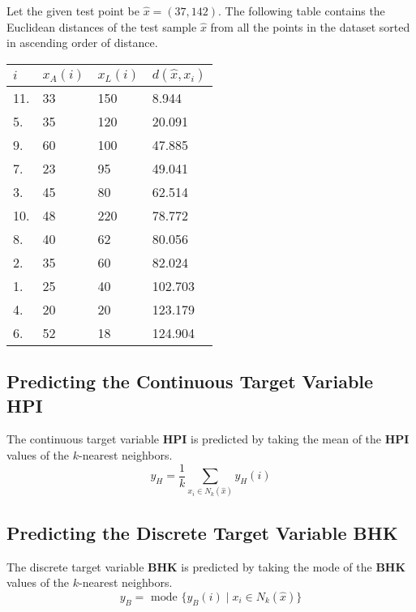 \documentclass[12pt]{article}
\begin{document}
    Let the given test point be $\hat{x} = (37, 142)$.
    The following table contains the Euclidean distances of the test sample $\hat{x}$ from all the points in the dataset
    sorted in ascending order of distance.
    \vspace*{10pt}
    \renewcommand{\arraystretch}{1.5}
    \begin{center}
        \begin{tabular}{| m{10mm} | m{15mm} | m{15mm} | m{80mm} |}
            \hline
            \large{$i$} & \large{$x_{A}(i)$} & \large{$x_{L}(i)$} & \large{$d(\hat{x}, x_{i})$} \\
            \hline
            \hline 11. & 33 & 150 & 8.944 \\
            \hline 5. & 35 & 120 & 20.091 \\
            \hline 9. & 60 & 100 & 47.885 \\
            \hline 7. & 23 & 95 & 49.041 \\
            \hline 3. & 45 & 80 & 62.514 \\
            \hline 10. & 48 & 220 & 78.772 \\
            \hline 8. & 40 & 62 & 80.056 \\
            \hline 2. & 35 & 60 & 82.024 \\
            \hline 1. & 25 & 40 & 102.703 \\
            \hline 4. & 20 & 20 & 123.179 \\
            \hline 6. & 52 & 18 & 124.904 \\
            \hline
        \end{tabular}
    \end{center}

    \subsection*{Predicting the Continuous Target Variable \textbf{HPI}}
    The continuous target variable \textbf{HPI} is predicted by taking the mean of the \textbf{HPI} values of the $k$-nearest neighbors.
    \begin{equation}
        \label{eq:HPI}
        y_{H} = \frac{1}{k} \sum_{x_{i} \in N_{k}(\hat{x})} y_{H}(i)
    \end{equation}

    \subsection*{Predicting the Discrete Target Variable \textbf{BHK}}
    The discrete target variable \textbf{BHK} is predicted by taking the mode of the \textbf{BHK} values of the $k$-nearest neighbors.
    \begin{equation}
        \label{eq:BHK}
        y_{B} = \text{ mode } \{ y_{B}(i) \mid x_{i} \in N_{k}(\hat{x}) \}
    \end{equation}
\end{document}

